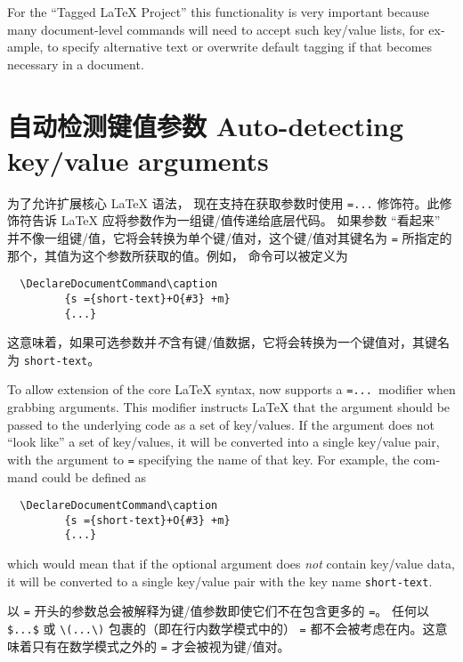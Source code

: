 \documentclass{ltnews}
\newcommand{\zhquote}[1]{“#1”}
\begin{document}
\begin{english}
For the \enquote{Tagged \LaTeX{} Project} this functionality is very
important because many document-level commands will need to accept
such key/value lists, for example, to specify alternative text or
overwrite default tagging if that becomes necessary in a document.
\end{english}


\section{自动检测键值参数 Auto-detecting key/value arguments}

为了允许扩展核心 \LaTeX{} 语法， 现在支持在获取参数时使用 \texttt{={...}} 修饰符。此修饰符告诉 \LaTeX{} 应将参数作为一组键/值传递给底层代码。
如果参数 \zhquote{看起来} 并不像一组键/值，它将会转换为单个键/值对，这个键/值对其键名为 \texttt{=} 所指定的那个，其值为这个参数所获取的值。例如， 命令可以被定义为
\begin{verbatim}
  \DeclareDocumentCommand\caption
         {s ={short-text}+O{#3} +m}
         {...}
\end{verbatim}
这意味着，如果可选参数并\emph{不}含有键/值数据，它将会转换为一个键值对，其键名为 \texttt{short-text}。

\begin{english}
To allow extension of the core \LaTeX{} syntax,  now supports
a \texttt{={...}}\ modifier when grabbing arguments. This modifier instructs
\LaTeX{} that the argument should be passed to the underlying code as
a set of key/values. If the argument does not \enquote{look like} a set
of key/values, it will be converted into a single key/value pair, with
the argument to \texttt{=} specifying the name of that key. For
example, the  command could be defined as
\begin{verbatim}
  \DeclareDocumentCommand\caption
         {s ={short-text}+O{#3} +m}
         {...}
\end{verbatim}
which would mean that if the optional argument does \emph{not}
contain key/value data, it will be converted to a single key/value
pair with the key name \texttt{short-text}.
\end{english}

以 \texttt{=} 开头的参数总会被解释为键/值参数即使它们不在包含更多的 \texttt{=}。
任何以 \verb|$...$| 或 \verb|\(...\)| 包裹的（即在行内数学模式中的） \texttt{=} 都不会被考虑在内。这意味着只有在数学模式之外的 \texttt{=} 才会被视为键/值对。
\end{document}
